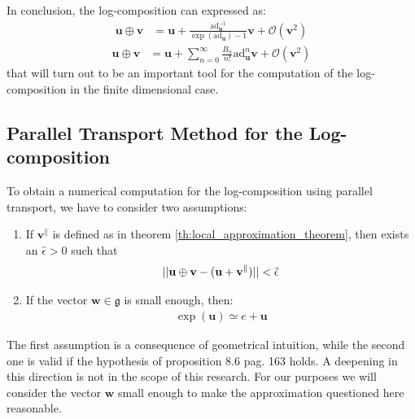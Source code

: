 In conclusion, the log-composition can expressed as:
\begin{align*}
\mathbf{u}\oplus \mathbf{v}  
&= 
\mathbf{u} + 
\frac{  
	\text{ad}_{\mathbf{u}}^{-1} 
}{
\exp{(\text{ad}_{\mathbf{u}})}-1
} \mathbf{v}  
+ 
\mathcal{O}(\mathbf{v} ^2) 
\end{align*}
\begin{align}\label{eq:taylor}
\mathbf{u}\oplus \mathbf{v}  
&=
\mathbf{u} 
+
\sum_{n=0}^{\infty} \frac{B_{n}}{n!} \text{ad}_{\mathbf{u}}^{ n} 
\mathbf{v}  
+
\mathcal{O}(\mathbf{v} ^2)
\end{align}
that will turn out to be an important tool for the computation of the log-composition in the finite dimensional case. 

\subsection{Parallel Transport Method for the Log-composition}
To obtain a numerical computation for the log-composition using parallel transport, we have to consider two assumptions: 
\begin{enumerate}
	\item If $\mathbf{v}^{\parallel} $ is defined as in theorem \ref{th:local_approximation_theorem}, then exists an $\hat{\epsilon} > 0$ such that
	\begin{align*}
	\vert\lvert 
		\mathbf{u}\oplus \mathbf{v}  
		-
		(
		\mathbf{u} + \mathbf{v}^{\parallel} 
		)
	 \rvert\vert <\hat{\epsilon}
	\end{align*}
	\item If the vector $\mathbf{w}\in\mathfrak{g}$ is small enough, then:
		\begin{align*}
		\exp(\mathbf{u}) \simeq e + \mathbf{u}
		\end{align*}
\end{enumerate}
The first assumption is a consequence of geometrical intuition, while
the second one is valid if the hypothesis of proposition 8.6 pag. 163 \cite{younes2010shapes} holds. A deepening in this direction is not in the scope of this research. For our purposes we will consider the vector $\mathbf{w}$ small enough to make the approximation questioned here reasonable.

